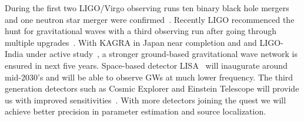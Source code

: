 \documentclass[prd,twocolumn,nofootinbib]{revtex4-1}
\begin{document}
During the first two LIGO/Virgo observing runs ten binary black hole mergers and one neutron star merger were confirmed~\cite{LIGOScientific:2018mvr}. Recently LIGO recommenced the hunt for gravitational waves with a third observing run after going through multiple upgrades~\cite{ligo:news}.
With KAGRA in Japan near completion and \cite{Akutsu:2018axf} and LIGO-India under active study~\cite{LIGOScientific:2019vkc}, a stronger ground-based gravitational wave network is ensured in next five years.
Space-based detector LISA~\cite{Audley:2017drz} will inaugurate around mid-2030's and will be able to observe GWs at much lower frequency.
The third generation detectors such as Cosmic Explorer and Einstein Telescope will provide us with improved sensitivities~\cite{Evans:2016mbw,Punturo:2010zz}.
With more detectors joining the quest we will achieve better precision in parameter estimation and source localization.









\end{document}
